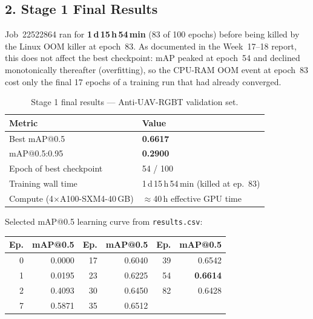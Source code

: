 \subsection*{2. Stage 1 Final Results}

Job~22522864 ran for \textbf{1\,d\,15\,h\,54\,min} (83 of 100
epochs) before being killed by the Linux OOM killer at epoch~83.
As documented in the Week~17--18 report, this does not affect the
best checkpoint: mAP peaked at epoch~54 and declined monotonically
thereafter (overfitting), so the CPU-RAM OOM event at epoch~83 cost
only the final 17 epochs of a training run that had already converged.

\begin{table}[h]
\centering
\caption{Stage 1 final results — Anti-UAV-RGBT validation set.}
\label{tab:stage1_final}
\begin{tabular}{ll}
\hline
\textbf{Metric}                   & \textbf{Value} \\
\hline
Best mAP@0.5                      & \textbf{0.6617} \\
mAP@0.5:0.95                      & \textbf{0.2900} \\
Epoch of best checkpoint          & 54 / 100 \\
Training wall time                & 1\,d\,15\,h\,54\,min (killed at ep.~83) \\
Compute (4$\times$A100-SXM4-40\,GB) & $\approx$40\,h effective GPU time \\
\hline
\end{tabular}
\end{table}

\noindent Selected mAP@0.5 learning curve from \texttt{results.csv}:

\begin{center}
\small
\begin{tabular}{rr|rr|rr}
\hline
\textbf{Ep.} & \textbf{mAP@0.5} &
\textbf{Ep.} & \textbf{mAP@0.5} &
\textbf{Ep.} & \textbf{mAP@0.5} \\
\hline
0  & 0.0000 &  17 & 0.6040 &  39 & 0.6542 \\
1  & 0.0195 &  23 & 0.6225 &  54 & \textbf{0.6614} \\
2  & 0.4093 &  30 & 0.6450 &  82 & 0.6428 \\
7  & 0.5871 &  35 & 0.6512 &    &        \\
\hline
\end{tabular}
\end{center}

